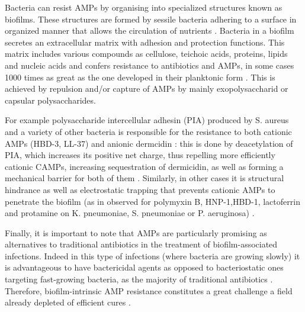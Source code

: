 Bacteria can resist AMPs by organising into specialized structures known as biofilms. These structures are formed by sessile bacteria adhering to a surface in organized manner that allows the circulation of nutrients \cite{Costerton1999}.
%
Bacteria in a biofilm secretes an extracellular matrix with adhesion and protection functions. This matrix includes various compounds as cellulose, teichoic acids, proteins, lipids and nucleic acids \cite{Jolivet-Gougeon2014} and confers resistance to antibiotics and AMPs, in some cases 1000 times as great as the one developed in their planktonic form \cite{Nickel1985,Mah2001}. This is achieved by repulsion and/or capture of AMPs by mainly exopolysaccharid or capsular polysaccharides.

For example polysaccharide intercellular adhesin (PIA) produced by S. aureus and a variety of other bacteria is responsible for the resistance to both cationic AMPs (HBD-3, LL-37) and anionic dermcidin \cite{Wang2004,Vuong2004PIA}: this is done by deacetylation of PIA, which increases its positive net charge, thus repelling more efficiently cationic CAMPs, increasing sequestration of dermicidin, as well as forming a mechanical barrier for both of them \cite{Vuong2004}.
%
Similarly, in other cases it is structural hindrance as well as electrostatic trapping that prevents cationic AMPs to penetrate the biofilm (as in observed for polymyxin B, HNP-1,HBD-1, lactoferrin and protamine on K. pneumoniae, S. pneumoniae or P. aeruginosa) \cite{Campos2004,Llobet2008}.

Finally, it is important to note that AMPs are particularly promising as alternatives to traditional antibiotics in the treatment of biofilm-associated infections. Indeed in this type of infections (where bacteria are growing slowly) it is advantageous to have bactericidal agents as opposed to bacteriostatic ones targeting fast-growing bacteria, as the majority of traditional antibiotics \cite{Batoni2011,Strempel2014}.
%
Therefore, biofilm-intrinsic AMP resistance constitutes a great challenge a field already depleted of efficient cures \cite{Joo2012,DiLuca2014}.

